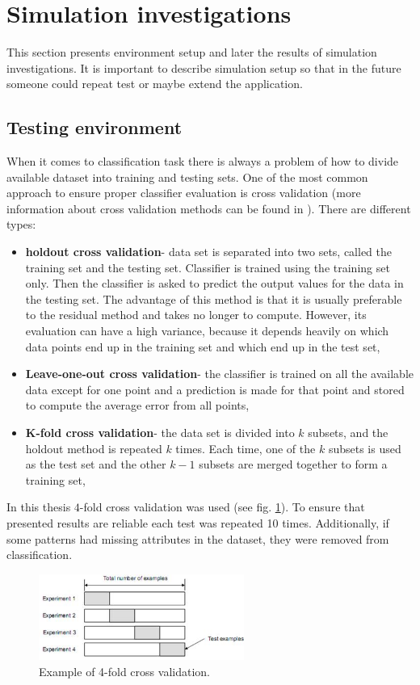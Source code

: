 \section{Simulation investigations}
\label{cha:Simulation_investugations}
This section presents environment setup and later the results of simulation
investigations. It is important to describe simulation setup so that in the
future someone could repeat test or maybe extend the application.
\subsection{Testing environment}
When it comes to classification task there is always a problem of how to
divide available dataset into training and testing sets. One of the most common 
approach to ensure proper classifier evaluation is cross validation (more
information about cross validation methods can be found in \cite{bib41}). 
There are different types:
\begin{itemize}
    \item \textbf{holdout cross validation}- data set is separated into two sets, called the 
        training set and the testing set. Classifier is trained using the 
        training set only. Then the classifier is asked to predict the output 
        values for the data in the testing set. The advantage of this method is 
        that it is usually preferable to the residual method and takes no longer 
        to compute. However, its evaluation can have a high variance, because
        it depends heavily on which data points end up in the training set and 
        which end up in the test set,
    \item \textbf{Leave-one-out cross validation}- the classifier is trained on all the
        available data except for one point and a prediction is made for that
        point and stored to compute the average error from all points,
    \item \textbf{K-fold cross validation}- the data set is divided into $k$ subsets, 
        and the holdout method is repeated $k$ times. Each time, one of the $k$ subsets 
        is used as the test set and the other $k-1$ subsets are merged together to form 
        a training set,
\end{itemize}
In this thesis $4$-fold cross validation was used (see fig.
\ref{fig:cross_validation}). To ensure that presented
results are reliable each test was repeated 10 times. Additionally, if some
patterns had missing attributes in the dataset, they were removed from
classification. 
\begin{figure}[H]
    \begin{center}
        \includegraphics[width=0.6\textwidth]{fig/cross_validation.jpg}
    \end{center}
    \caption{Example of 4-fold cross validation.}
    \label{fig:cross_validation}
\end{figure}
\label{cha:Simulation_environment}
